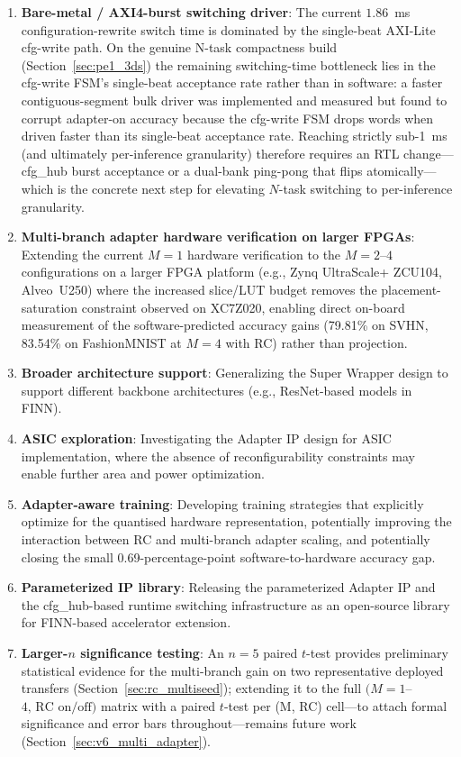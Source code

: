 \documentclass[12pt, a4paper]{report}
\numberwithin{equation}{chapter}
\numberwithin{figure}{chapter}
\numberwithin{table}{chapter}
\numberwithin{algorithm}{chapter}
\begin{document}
\begin{enumerate}
    \item \textbf{Bare-metal / AXI4-burst switching driver}: The current $1.86$~ms configuration-rewrite switch time is dominated by the single-beat AXI-Lite cfg-write path. On the genuine N-task compactness build (Section~\ref{sec:pe1_3ds}) the remaining switching-time bottleneck lies in the cfg-write FSM's single-beat acceptance rate rather than in software: a faster contiguous-segment bulk driver was implemented and measured but found to corrupt adapter-on accuracy because the cfg-write FSM drops words when driven faster than its single-beat acceptance rate. Reaching strictly sub-1~ms (and ultimately per-inference granularity) therefore requires an RTL change---cfg\_hub burst acceptance or a dual-bank ping-pong that flips atomically---which is the concrete next step for elevating $N$-task switching to per-inference granularity.
    \item \textbf{Multi-branch adapter hardware verification on larger FPGAs}: Extending the current $M{=}1$ hardware verification to the $M{=}2$--$4$ configurations on a larger FPGA platform (e.g., Zynq UltraScale+ ZCU104, Alveo~U250) where the increased slice/LUT budget removes the placement-saturation constraint observed on XC7Z020, enabling direct on-board measurement of the software-predicted accuracy gains (79.81\% on SVHN, 83.54\% on FashionMNIST at $M=4$ with RC) rather than projection.
    \item \textbf{Broader architecture support}: Generalizing the Super Wrapper design to support different backbone architectures (e.g., ResNet-based models in FINN).
    \item \textbf{ASIC exploration}: Investigating the Adapter IP design for ASIC implementation, where the absence of reconfigurability constraints may enable further area and power optimization.
    \item \textbf{Adapter-aware training}: Developing training strategies that explicitly optimize for the quantised hardware representation, potentially improving the interaction between RC and multi-branch adapter scaling, and potentially closing the small 0.69-percentage-point software-to-hardware accuracy gap.
    \item \textbf{Parameterized IP library}: Releasing the parameterized Adapter IP and the cfg\_hub-based runtime switching infrastructure as an open-source library for FINN-based accelerator extension.
    \item \textbf{Larger-$n$ significance testing}: An $n=5$ paired $t$-test provides preliminary statistical evidence for the multi-branch gain on two representative deployed transfers (Section~\ref{sec:rc_multiseed}); extending it to the full $(M{=}1$--$4,\,\text{RC on/off})$ matrix with a paired $t$-test per (M, RC) cell---to attach formal significance and error bars throughout---remains future work (Section~\ref{sec:v6_multi_adapter}).

\end{enumerate}
\end{document}
